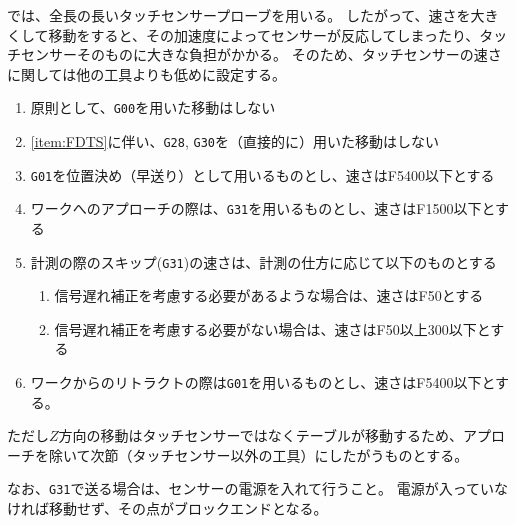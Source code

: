 \clearpage
\DMname では、全長の長いタッチセンサープローブを用いる。
したがって、速さを大きくして移動をすると、その加速度によってセンサーが反応してしまったり、タッチセンサーそのものに大きな負担がかかる。
そのため、タッチセンサーの速さに関しては他の工具よりも低めに設定する。
\begin{enumerate}[label=\Roman*., ref=\Roman*]
\item \label{item:FDTS} 原則として、\verb|G00|を用いた移動はしない
\item \ref{item:FDTS}に伴い、\verb|G28|, \verb|G30|を（直接的に）用いた移動はしない
\item \verb|G01|を位置決め（早送り）として用いるものとし、速さはF5400以下とする
\item ワークへのアプローチの際は、\verb|G31|を用いるものとし、速さはF1500以下とする
\item 計測の際のスキップ(\verb|G31|)の速さは、計測の仕方に応じて以下のものとする
  \begin{enumerate}
  \item {}信号遅れ補正を考慮する必要があるような場合は、速さはF50とする
  \item 信号遅れ補正を考慮する必要がない場合は、速さはF50以上300以下とする
  \end{enumerate}
\item ワークからのリトラクトの際は\verb|G01|を用いるものとし、速さはF5400以下とする。
\end{enumerate}
ただし$Z$方向の移動はタッチセンサーではなくテーブルが移動するため、アプローチを除いて次節（タッチセンサー以外の工具）にしたがうものとする。

なお、\verb|G31|で送る場合は、センサーの電源を入れて行うこと。
電源が入っていなければ移動せず、その点がブロックエンドとなる。



